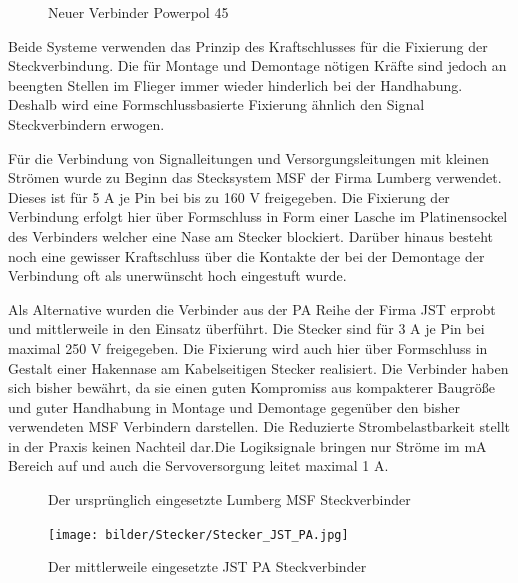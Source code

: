 \begin{figure}[H]
\centering
{}
\caption{Neuer Verbinder  Powerpol 45} 
\label{fig:Neuer Verbinder  Powerpol 45}
\end{figure}

Beide Systeme verwenden das Prinzip des Kraftschlusses für die Fixierung der Steckverbindung. Die für Montage und Demontage nötigen Kräfte sind jedoch an beengten Stellen im Flieger immer wieder hinderlich bei der Handhabung. Deshalb wird eine Formschlussbasierte Fixierung ähnlich den Signal Steckverbindern erwogen.

Für die Verbindung von Signalleitungen  und Versorgungsleitungen mit kleinen Strömen wurde zu Beginn das Stecksystem MSF der Firma Lumberg verwendet.
Dieses ist für 5 A je Pin bei bis zu 160 V freigegeben. Die Fixierung der Verbindung erfolgt hier über Formschluss in Form einer Lasche im Platinensockel des Verbinders welcher eine Nase am Stecker blockiert. Darüber hinaus besteht noch eine gewisser Kraftschluss über die Kontakte der bei der Demontage der Verbindung oft als unerwünscht hoch eingestuft wurde.

Als Alternative wurden die Verbinder aus der PA Reihe der Firma JST erprobt und mittlerweile in den Einsatz überführt.
Die Stecker sind für 3 A je Pin bei maximal 250 V freigegeben.
Die Fixierung wird auch hier über Formschluss in Gestalt einer Hakennase am Kabelseitigen Stecker realisiert.
Die Verbinder haben sich bisher bewährt, da sie einen guten Kompromiss aus kompakterer Baugröße und guter Handhabung in Montage und Demontage gegenüber den bisher verwendeten MSF Verbindern darstellen.
Die Reduzierte Strombelastbarkeit stellt in der Praxis keinen Nachteil dar.Die Logiksignale bringen nur Ströme im mA Bereich auf und auch die Servoversorgung leitet maximal 1 A.

\begin{figure}[H]
\centering
{}
\caption{Der ursprünglich eingesetzte Lumberg MSF Steckverbinder} 
\label{fig:Der ursprünglich eingesetzte Lumberg MSF Steckverbinder}
\end{figure}

\begin{figure}[H]
\centering
\texttt{[image: bilder/Stecker/Stecker\_JST\_PA.jpg]} 
\caption{Der mittlerweile eingesetzte JST PA Steckverbinder} 
\label{fig:Der mittlerweile eingesetzte JST PA Steckverbinder}
\end{figure}


